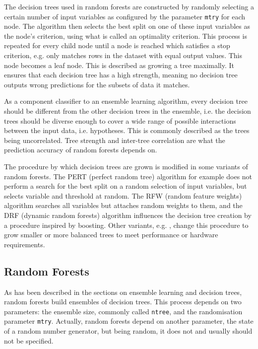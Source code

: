 \documentclass[a4paper,man,12pt,apacite,floatsintext]{apa6} %
\begin{document}
The decision trees used in random forests are constructed by randomly
selecting a certain number of input variables as configured by the parameter
\texttt{mtry} for each node.
The algorithm then selects the best split on one of these input
variables as the node's criterion, using what is called an optimality criterion.
This process is repeated for every child node until a node is reached
which satisfies a stop criterion, e.g.
only matches rows in the dataset with equal output values.
This node becomes a leaf node.
This is described as growing a tree maximally.
It ensures that each decision tree has a high strength,
meaning no decision tree outputs wrong predictions for the subsets of data
it matches. \cite{breiman2001random}

As a component classifier to an ensemble learning algorithm,
every decision tree should be different from the other decision trees in
the ensemble, i.e. the decision trees should be diverse enough
to cover a wide range of possible interactions between the input data,
i.e. hypotheses.
This is commonly described as the trees being uncorrelated.
Tree strength and inter-tree correlation are what the prediction accuracy
of random forests depends on. \cite{breiman2001random}

The procedure by which decision trees are grown is modified in some
variants of random forests.
The PERT (perfect random tree) algorithm \cite{cutler2001pert} for example does not perform a
search for the best split on a random selection of input variables,
but selects variable and threshold at random.
The RFW (random feature weights) algorithm \cite{maudes2012random} searches all variables but attaches random
weights to them, and the DRF (dynamic random forests) algorithm \cite{bernard2012dynamic} influences the
decision tree creation by a procedure inspired by boosting.
Other variants, e.g. , change this procedure to
grow smaller or more balanced trees to meet performance or
hardware requirements.

\subsection{Random Forests}
As has been described in the sections on ensemble learning and decision trees,
random forests build ensembles of decision trees.
This process depends on two parameters: the ensemble size, commonly called
\texttt{ntree}, and the randomisation parameter \texttt{mtry}.
Actually, random forests depend on another parameter,
the state of a random number generator, but being random,
it does not and usually should not be specified.
\end{document}

